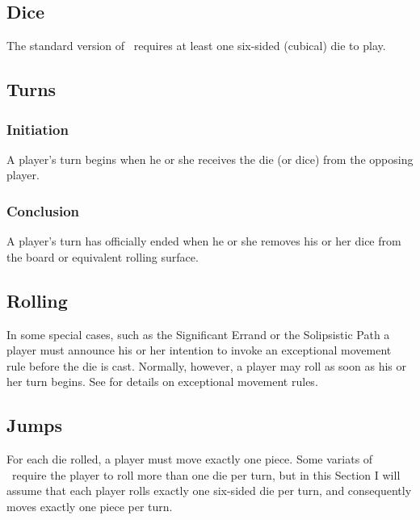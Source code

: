 %

\subsection{Dice}\label{dice}
The standard version of \know\ requires at least one six-sided (cubical)
die to play.

\subsection{Turns}\label{turns}
  \subsubsection{Initiation}\label{turn_begin}
  A player's turn begins when he or she receives the die (or dice) from
  the opposing player.
  \subsubsection{Conclusion}\label{turn_end}
  A player's turn has officially ended when he or she removes his or her
  dice from the board or equivalent rolling surface.

\subsection{Rolling}\label{rolling}
In some special cases,
such as the 
Significant Errand
or the Solipsistic Path
a player must announce his or her intention to invoke
an exceptional movement rule before the die is cast.
Normally, however, a player may roll as soon as his or her
turn begins.  See  for details on
exceptional movement rules.

\subsection{Jumps}\label{jumps}
For each die rolled, a player must move exactly one piece.
Some variats of \know\ require the player to roll more than one
die per turn, but in this Section I will assume that each player
rolls exactly one six-sided die per turn, and consequently moves
exactly one piece per turn.


